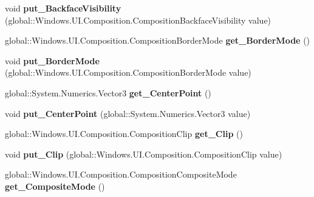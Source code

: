 \begin{DoxyCompactItemize}
void {\bfseries put\+\_\+\+Backface\+Visibility} (global\+::\+Windows.\+U\+I.\+Composition.\+Composition\+Backface\+Visibility value)
\item 
\mbox{\label{interface_windows_1_1_u_i_1_1_composition_1_1_i_visual_ad857db42be0a85e8710144f9a8a0b412}} 
global\+::\+Windows.\+U\+I.\+Composition.\+Composition\+Border\+Mode {\bfseries get\+\_\+\+Border\+Mode} ()
\item 
\mbox{\label{interface_windows_1_1_u_i_1_1_composition_1_1_i_visual_a81dd6285766651fb4d55a78808dbfbdf}} 
void {\bfseries put\+\_\+\+Border\+Mode} (global\+::\+Windows.\+U\+I.\+Composition.\+Composition\+Border\+Mode value)
\item 
\mbox{\label{interface_windows_1_1_u_i_1_1_composition_1_1_i_visual_a155a09b37b8789970281666bc3111f3d}} 
global\+::\+System.\+Numerics.\+Vector3 {\bfseries get\+\_\+\+Center\+Point} ()
\item 
\mbox{\label{interface_windows_1_1_u_i_1_1_composition_1_1_i_visual_ac736f9c5171d694ea168970125dee881}} 
void {\bfseries put\+\_\+\+Center\+Point} (global\+::\+System.\+Numerics.\+Vector3 value)
\item 
\mbox{\label{interface_windows_1_1_u_i_1_1_composition_1_1_i_visual_ad0c2e9949756caf002a9224770412cd2}} 
global\+::\+Windows.\+U\+I.\+Composition.\+Composition\+Clip {\bfseries get\+\_\+\+Clip} ()
\item 
\mbox{\label{interface_windows_1_1_u_i_1_1_composition_1_1_i_visual_aa89c3bfb77967afd71d66e1adb50d78a}} 
void {\bfseries put\+\_\+\+Clip} (global\+::\+Windows.\+U\+I.\+Composition.\+Composition\+Clip value)
\item 
\mbox{\label{interface_windows_1_1_u_i_1_1_composition_1_1_i_visual_a8d4c301ec2cd6a02a533dd5077a01dcf}} 
global\+::\+Windows.\+U\+I.\+Composition.\+Composition\+Composite\+Mode {\bfseries get\+\_\+\+Composite\+Mode} ()

\end{DoxyCompactItemize}
